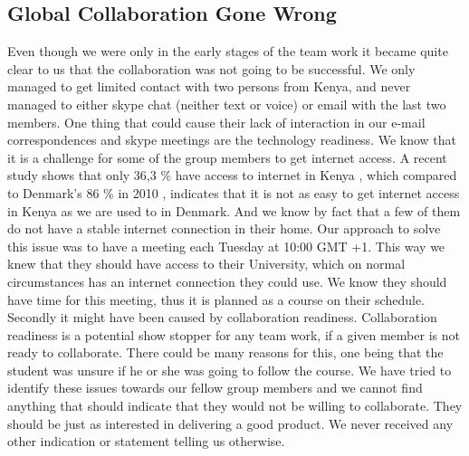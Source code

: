 \subsection{Global Collaboration Gone Wrong} \label{sec:teamworkgonewrong}
Even though we were only in the early stages of the team work it became quite clear to us that the collaboration was not going to be successful. We only managed to get limited contact with two persons from Kenya, and never managed to either skype chat (neither text or voice) or email with the last two members. One thing that could cause their lack of interaction in our e-mail correspondences and skype meetings are the technology readiness. We know that it is a challenge for some of the group members to get internet access. A recent study shows that only 36,3 \% have access to internet in Kenya \cite{capitalfm2012internet}, which compared to Denmark's 86 \% in 2010 \cite{folketingets-eu-oplysning}, indicates that it is not as easy to get internet access in Kenya as we are used to in Denmark. And we know by fact that a few of them do not have a stable internet connection in their home. Our approach to solve this issue was to have a meeting each Tuesday at 10:00 GMT +1. This way we knew that they should have access to their University, which on normal circumstances has an internet connection they could use. We know they should have time for this meeting, thus it is planned as a course on their schedule. Secondly it might have been caused by collaboration readiness. Collaboration readiness is a potential show stopper for any team work, if a given member is not ready to collaborate. There could be many reasons for this, one being that the student was unsure if he or she was going to follow the course. We have tried to identify these issues towards our fellow group members and we cannot find anything that should indicate that they would not be willing to collaborate. They should be just as interested in delivering a good product. We never received any other indication or statement telling us otherwise.

